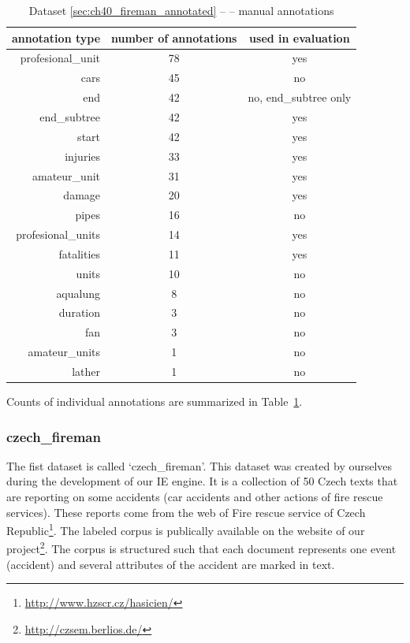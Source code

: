 \begin{table}
\centering
\begin{tabular}{|r||c|c|}
\hline
\textbf{annotation type} & \textbf{number of annotations} & \textbf{used in evaluation}\\
\hline
\hline
profesional\_unit & 78 & yes\\
\hline
cars & 45 & no\\
\hline
end & 42 & no, end\_subtree only\\
\hline
end\_subtree & 42 & yes\\
\hline
start & 42 & yes\\
\hline
injuries & 33 & yes\\
\hline
amateur\_unit & 31 & yes\\
\hline
damage & 20 & yes\\
\hline
pipes & 16 & no\\
\hline
profesional\_units & 14 & yes\\
\hline
fatalities & 11 & yes\\
\hline
units & 10 & no\\
\hline
aqualung & 8 & no\\
\hline
duration & 3 & no\\
\hline
fan & 3 & no\\
\hline
amateur\_units & 1 & no\\
\hline
lather & 1 & no\\
\hline
\end{tabular}
\caption{Dataset \ref{sec:ch40_fireman_annotated} --  -- manual annotations} \label{tab:ch40_fire_with}
\end{table}


Counts of individual annotations are summarized in Table~\ref{tab:ch40_fire_with}.

\subsubsection{czech\_fireman}

The fist dataset is called `czech\_fireman'. This dataset was created by ourselves during the development of our IE  engine. It is a collection of 50 Czech texts that are reporting on some accidents (car accidents and other actions of fire rescue services). These reports come from the web of Fire rescue service of Czech Republic\footnote{\url{http://www.hzscr.cz/hasicien/}}. The labeled corpus is publically available on the website of our project\footnote{\url{http://czsem.berlios.de/}}.
The corpus is structured such that each document represents one event (accident) and several attributes of the accident are marked in text. 


